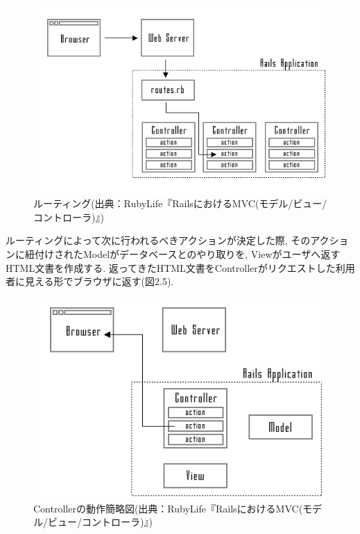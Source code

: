 \begin{description}
\begin{itemize}
\begin{figure}
\begin{center}
\includegraphics[width=14cm]{fig/route.png}
\caption{ルーティング(出典：RubyLife『RailsにおけるMVC(モデル/ビュー/コントローラ)』)}
\end{center}
\end{figure}

ルーティングによって次に行われるべきアクションが決定した際, そのアクションに紐付けされたModelがデータベースとのやり取りを, Viewがユーザへ返すHTML文書を作成する.
返ってきたHTML文書をControllerがリクエストした利用者に見える形でブラウザに返す(図2.5).

\begin{figure}
\begin{center}
\includegraphics[width=14cm]{fig/controller.png}
\caption{Controllerの動作簡略図(出典：RubyLife『RailsにおけるMVC(モデル/ビュー/コントローラ)』)}
\end{center}
\end{figure}

\end{itemize}

\end{description}

